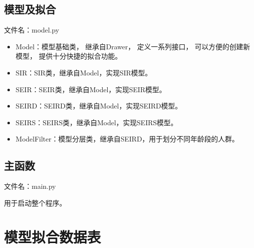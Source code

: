 \begin{appendix}
      \subsection*{模型及拟合}
      \par 文件名：model.py
      \begin{itemize}
            \item Model：模型基础类，
                  继承自Drawer，
                  定义一系列接口，
                  可以方便的创建新模型，
                  提供十分快捷的拟合功能。
            \item SIR：SIR类，继承自Model，实现SIR模型。
            \item SEIR：SEIR类，继承自Model，实现SEIR模型。
            \item SEIRD：SEIRD类，继承自Model，实现SEIRD模型。
            \item SEIRS：SEIRS类，继承自Model，实现SEIRS模型。
            \item ModelFilter：模型分层类，继承自SEIRD，用于划分不同年龄段的人群。
      \end{itemize}
      
      \subsection*{主函数}
      \par 文件名：main.py
      \par 用于启动整个程序。
      
      \section{模型拟合数据表\label{append:数据表}}
\end{appendix}